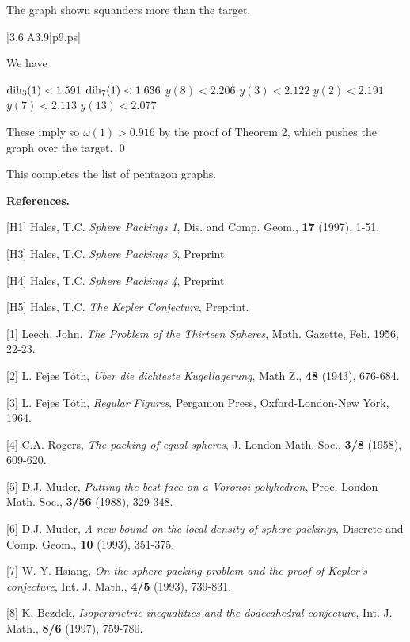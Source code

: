 \bigskip

 The graph shown 
squanders more than the target.  \endproclaim

\gram|3.6|A3.9|p9.ps|  %


We have 

$\operatorname{dih}_3(1) < 1.591$ \newline
$\operatorname{dih}_7(1) < 1.636$ \newline
$y(8)<2.206$ \newline
$y(3)<2.122$ \newline
$y(2)<2.191$ \newline
$y(7)<2.113$ \newline
$y(13)<2.077$ \newline

These imply 
so $\omega(1)>0.916$ by the proof of Theorem 2, which pushes the graph over the target. \qed

\bigskip

This completes the list of pentagon graphs.


\bigskip



{\bf References.}

[H1] Hales, T.C. {\it Sphere Packings 1}, Dis. and Comp. Geom., 
{\bf 17} (1997), 1-51.

[H3] Hales, T.C. {\it Sphere Packings 3}, Preprint.

[H4] Hales, T.C. {\it Sphere Packings 4}, Preprint.

[H5] Hales, T.C. {\it The Kepler Conjecture}, Preprint.

[1] Leech, John.  {\it The Problem of the Thirteen Spheres},  Math. Gazette,  
Feb. 1956, 22-23.

[2] L. Fejes T\'oth, {\it Uber die dichteste Kugellagerung}, Math 
Z., {\bf 48} (1943), 676-684.

[3] L. Fejes T\'oth, {\it Regular Figures}, Pergamon Press, Oxford-London-New York, 1964.


[4] C.A. Rogers, {\it The packing of equal spheres}, J. London Math. Soc.,
{\bf 3/8} (1958), 609-620.

[5] D.J. Muder, {\it Putting the best face on a Voronoi polyhedron}, 
Proc. London Math. Soc., {\bf 3/56} (1988), 329-348.

[6] D.J. Muder, {\it A new bound on the local density of sphere packings}, 
Discrete and Comp. Geom., {\bf 10} (1993), 351-375.

[7] W.-Y. Hsiang, {\it On the sphere packing problem and the proof of Kepler's conjecture},
Int. J. Math., {\bf 4/5} (1993), 739-831.

[8] K. Bezdek, {\it Isoperimetric inequalities and the dodecahedral conjecture}, Int. J. Math.,
{\bf 8/6} (1997), 759-780.

\bye
